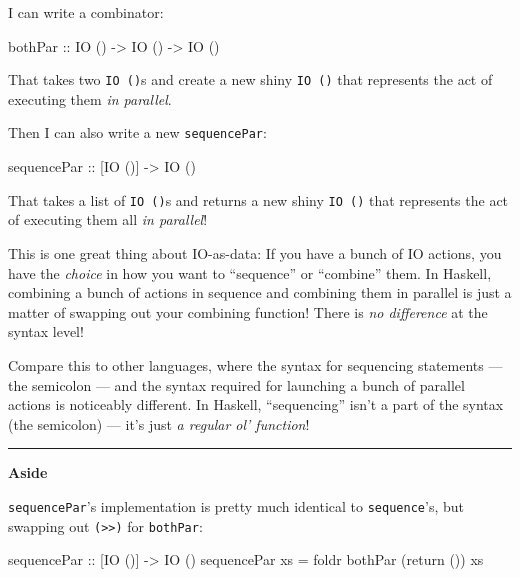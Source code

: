 \documentclass[]{article}
\newenvironment{Shaded}{}{}
\newcommand{\DataTypeTok}[1]{\textcolor[rgb]{0.56,0.13,0.00}{{#1}}}
\newcommand{\OtherTok}[1]{\textcolor[rgb]{0.00,0.44,0.13}{{#1}}}
\newcommand{\FunctionTok}[1]{\textcolor[rgb]{0.02,0.16,0.49}{{#1}}}
\newcommand{\NormalTok}[1]{{#1}}
\begin{document}
I can write a combinator:

\begin{Shaded}
\begin{Highlighting}[]
\OtherTok{bothPar ::} \DataTypeTok{IO} \NormalTok{() }\OtherTok{->} \DataTypeTok{IO} \NormalTok{() }\OtherTok{->} \DataTypeTok{IO} \NormalTok{()}
\end{Highlighting}
\end{Shaded}

That takes two \texttt{IO\ ()}s and create a new shiny \texttt{IO\ ()}
that represents the act of executing them \emph{in parallel}.

Then I can also write a new \texttt{sequencePar}:

\begin{Shaded}
\begin{Highlighting}[]
\OtherTok{sequencePar ::} \NormalTok{[}\DataTypeTok{IO} \NormalTok{()] }\OtherTok{->} \DataTypeTok{IO} \NormalTok{()}
\end{Highlighting}
\end{Shaded}

That takes a list of \texttt{IO\ ()}s and returns a new shiny
\texttt{IO\ ()} that represents the act of executing them all \emph{in
parallel}!

This is one great thing about IO-as-data: If you have a bunch of IO
actions, you have the \emph{choice} in how you want to ``sequence'' or
``combine'' them. In Haskell, combining a bunch of actions in sequence
and combining them in parallel is just a matter of swapping out your
combining function! There is \emph{no difference} at the syntax level!

Compare this to other languages, where the syntax for sequencing
statements --- the semicolon --- and the syntax required for launching a
bunch of parallel actions is noticeably different. In Haskell,
``sequencing'' isn't a part of the syntax (the semicolon) --- it's just
\emph{a regular ol' function}!

\begin{center}\rule{0.5\linewidth}{\linethickness}\end{center}

\textbf{Aside}

\texttt{sequencePar}'s implementation is pretty much identical to
\texttt{sequence}'s, but swapping out
\texttt{(\textgreater{}\textgreater{})} for \texttt{bothPar}:

\begin{Shaded}
\begin{Highlighting}[]
\OtherTok{sequencePar ::} \NormalTok{[}\DataTypeTok{IO} \NormalTok{()] }\OtherTok{->} \DataTypeTok{IO} \NormalTok{()}
\NormalTok{sequencePar xs }\FunctionTok{=} \NormalTok{foldr bothPar (return ()) xs}
\end{Highlighting}
\end{Shaded}
\end{document}
